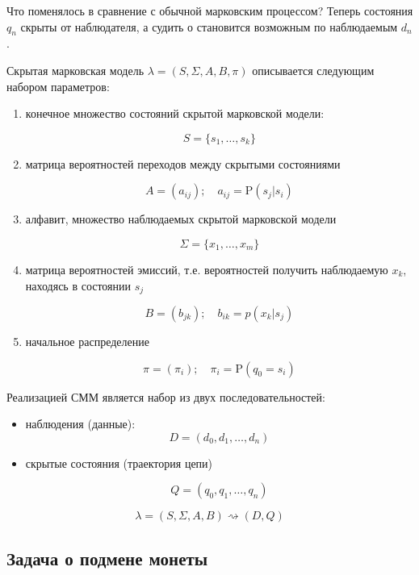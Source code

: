 \documentclass[letterpaper, 11pt]{article}
\newcommand{\prob}{\mathrm{P}}
\begin{document}
Что поменялось в сравнение с обычной марковским процессом? Теперь состояния $q_n$ скрыты от наблюдателя, а судить о становится возможным по наблюдаемым $d_n$.

Скрытая марковская модель $\lambda=(S,\Sigma, A,B, \pi)$ описывается следующим набором параметров:

\begin{enumerate}


\item конечное множество состояний скрытой марковской модели:

$$S=\{s_1,\ldots,s_k\}$$

\item матрица вероятностей переходов между скрытыми состояниями

$$A=(a_{ij}); \quad a_{ij}=\prob(s_j|s_i)$$

\item алфавит, множество наблюдаемых скрытой марковской модели

$$\Sigma=\{x_1,\ldots,x_m\}$$

\item матрица вероятностей эмиссий, т.е. вероятностей получить наблюдаемую $x_k$, находясь в состоянии $s_j$

$$B=(b_{jk});\quad b_{ik}=p(x_k|s_j)$$

\item начальное распределение

$$\pi=(\pi_i);\quad\pi_i=\prob(q_0=s_i)$$

\end{enumerate}


Реализацией СММ является набор из двух последовательностей:

\begin{itemize}

\item наблюдения (данные):
	$$D=(d_0,d_1,\ldots,d_n)$$
	
\item скрытые состояния (траектория цепи)

$$Q=(q_0,q_1,\ldots,q_n)$$

\end{itemize}

$$\lambda=(S,\Sigma, A,B)\rightsquigarrow (D,Q)$$

\subsection{Задача о подмене монеты}
\end{document}
